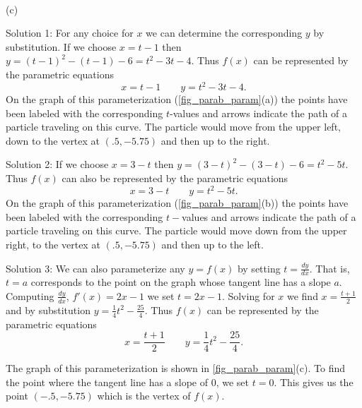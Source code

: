 {
\\(c)}

{Solution 1: For any choice for $x$ we can determine the corresponding $y$ by substitution. If we choose $x=t-1$ then $y=(t-1)^2-(t-1)-6=t^2-3t-4$. Thus $f(x)$ can be represented by the parametric equations
\[x=t-1 \qquad y=t^2-3t-4.\]
On the graph of this parameterization (\autoref{fig_parab_param}(a)) the points have been labeled with the corresponding $t$-values and arrows indicate the path of a particle traveling on this curve. The particle would move from the upper left, down to the vertex at $(.5,-5.75)$ and then up to the right.

Solution 2: If we choose $x=3-t$ then $y=(3-t)^2-(3-t)-6=t^2-5t$. Thus $f(x)$ can also be represented by the parametric equations
\[x=3-t \qquad y=t^2-5t.\]
On the graph of this parameterization (\autoref{fig_parab_param}(b)) the points have been labeled with the corresponding $t-$values and arrows indicate the path of a particle traveling on this curve. The particle would move down from the upper right, to the vertex at $(.5,-5.75)$ and then up to the left.

Solution 3: We can also parameterize any $y=f(x)$ by setting $t=\frac{dy}{dx}$. That is, $t=a$ corresponds to the point on the graph whose tangent line has a slope $a$. Computing $\frac{dy}{dx}$, $f'(x) = 2x-1$ we set $t=2x-1$. Solving for $x$ we find $x=\frac{t+1}{2}$ and by substitution $y=\frac{1}{4}t^2 - \frac{25}{4}$. Thus $f(x)$ can be represented by the parametric equations
\[x=\frac{t+1}{2} \qquad y=\frac{1}{4}t^2 - \frac{25}{4}.\]

The graph of this parameterization is shown in \autoref{fig_parab_param}(c). To find the point where the tangent line has a slope of $0$, we set $t=0$. This gives us the point $(-.5, -5.75)$ which is the vertex of $f(x)$.}

